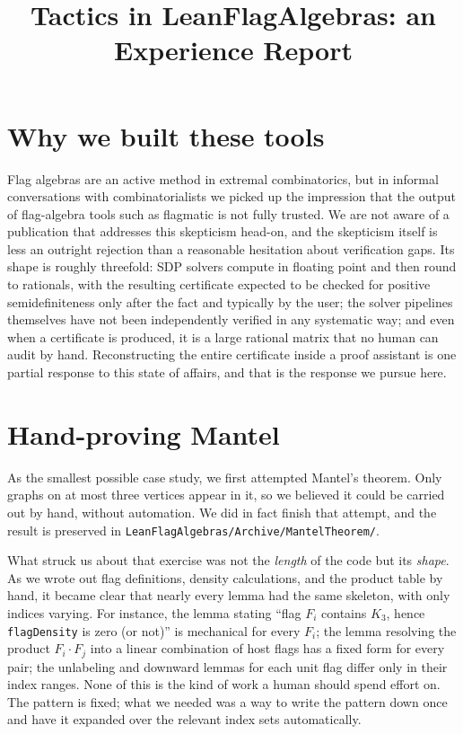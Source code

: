 \documentclass[11pt]{article}
\title{Tactics in LeanFlagAlgebras: an Experience Report}
\author{}
\date{}
\begin{document}
\maketitle

\section{Why we built these tools}

Flag algebras are an active method in extremal combinatorics, but in
informal conversations with combinatorialists we picked up the impression
that the output of flag-algebra tools such as flagmatic is not fully
trusted. We are not aware of a publication that addresses this skepticism
head-on, and the skepticism itself is less an outright rejection than a
reasonable hesitation about verification gaps. Its shape is roughly
threefold: SDP solvers compute in floating point and then round to
rationals, with the resulting certificate expected to be checked for
positive semidefiniteness only after the fact and typically by the user;
the solver pipelines themselves have not been independently verified in
any systematic way; and even when a certificate is produced, it is a
large rational matrix that no human can audit by hand. Reconstructing
the entire certificate inside a proof assistant is one partial response
to this state of affairs, and that is the response we pursue here.

\section{Hand-proving Mantel}

As the smallest possible case study, we first attempted Mantel's theorem.
Only graphs on at most three vertices appear in it, so we believed it could
be carried out by hand, without automation. We did in fact finish that
attempt, and the result is preserved in
\texttt{LeanFlagAlgebras/Archive/MantelTheorem/}.

What struck us about that exercise was not the \emph{length} of the code
but its \emph{shape}. As we wrote out flag definitions, density
calculations, and the product table by hand, it became clear that nearly
every lemma had the same skeleton, with only indices varying. For instance,
the lemma stating ``flag $F_i$ contains $K_3$, hence \texttt{flagDensity} is
zero (or not)'' is mechanical for every $F_i$; the lemma resolving the
product $F_i \cdot F_j$ into a linear combination of host flags has a fixed
form for every pair; the unlabeling and downward lemmas for each unit flag
differ only in their index ranges. None of this is the kind of work a human
should spend effort on. The pattern is fixed; what we needed was a way to
write the pattern down once and have it expanded over the relevant index
sets automatically.
\end{document}
